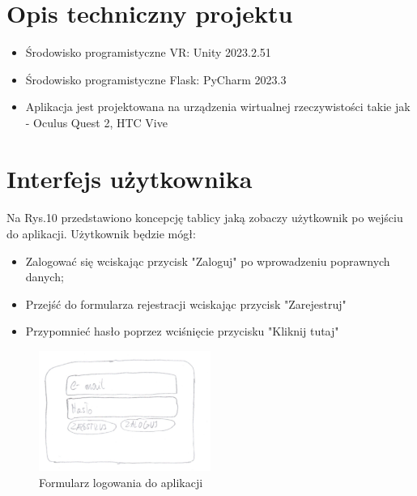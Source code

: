 \documentclass[12pt, letterpaper]{article}
\begin{document}
\section{Opis techniczny projektu}
		
		\begin{itemize}
				\item Środowisko programistyczne VR: Unity 2023.2.51
				\item Środowisko programistyczne Flask: PyCharm 2023.3
				\item Aplikacja jest projektowana na urządzenia wirtualnej rzeczywistości takie jak - Oculus Quest 2, HTC Vive
		\end{itemize}
		
\newpage	
\newpage
\section{Interfejs użytkownika}
		
\paragraph{}
Na Rys.10 przedstawiono koncepcję tablicy jaką zobaczy użytkownik po wejściu do aplikacji. Użytkownik będzie mógł:
		\begin{itemize}
				\item Zalogować się wciskając przycisk "Zaloguj" po wprowadzeniu poprawnych danych;
				\item Przejść do formularza rejestracji wciskając przycisk "Zarejestruj"
				\item Przypomnieć hasło poprzez wciśnięcie przycisku "Kliknij tutaj"
		\end{itemize}
		
\begin{figure}[h]
  \centering
      \includegraphics[width=0.5\textwidth]{GUI_logowanie}
  \caption{Formularz logowania do aplikacji}
\end{figure}
\end{document}
